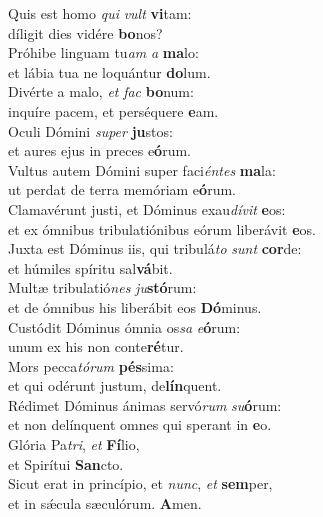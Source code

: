 \evenverse Quis est homo \textit{qui} \textit{vult} \textbf{vi}tam:~\*\\
\evenverse díligit dies vidére \textbf{bo}nos?\\
\oddverse Próhibe linguam tu\textit{am} \textit{a} \textbf{ma}lo:~\*\\
\oddverse et lábia tua ne loquántur \textbf{do}lum.\\
\evenverse Divérte a malo, \textit{et} \textit{fac} \textbf{bo}num:~\*\\
\evenverse inquíre pacem, et perséquere \textbf{e}am.\\
\oddverse Oculi Dómini \textit{su}\textit{per} \textbf{ju}stos:~\*\\
\oddverse et aures ejus in preces e\textbf{ó}rum.\\
\evenverse Vultus autem Dómini super faci\textit{én}\textit{tes} \textbf{ma}la:~\*\\
\evenverse ut perdat de terra memóriam e\textbf{ó}rum.\\
\oddverse Clamavérunt justi, et Dóminus exau\textit{dí}\textit{vit} \textbf{e}os:~\*\\
\oddverse et ex ómnibus tribulatiónibus eórum liberávit \textbf{e}os.\\
\evenverse Juxta est Dóminus iis, qui tribulá\textit{to} \textit{sunt} \textbf{cor}de:~\*\\
\evenverse et húmiles spíritu sal\textbf{vá}bit.\\
\oddverse Multæ tribulatió\textit{nes} \textit{ju}\textbf{stó}rum:~\*\\
\oddverse et de ómnibus his liberábit eos \textbf{Dó}minus.\\
\evenverse Custódit Dóminus ómnia os\textit{sa} \textit{e}\textbf{ó}rum:~\*\\
\evenverse unum ex his non conte\textbf{ré}tur.\\
\oddverse Mors pecca\textit{tó}\textit{rum} \textbf{pés}sima:~\*\\
\oddverse et qui odérunt justum, de\textbf{lín}quent.\\
\evenverse Rédimet Dóminus ánimas servó\textit{rum} \textit{su}\textbf{ó}rum:~\*\\
\evenverse et non delínquent omnes qui sperant in \textbf{e}o.\\
\oddverse Glória Pa\textit{tri}, \textit{et} \textbf{Fí}lio,~\*\\
\oddverse et Spirítui \textbf{San}cto.\\
\evenverse Sicut erat in princípio, et \textit{nunc}, \textit{et} \textbf{sem}per,~\*\\
\evenverse et in sǽcula sæculórum. \textbf{A}men.\\

